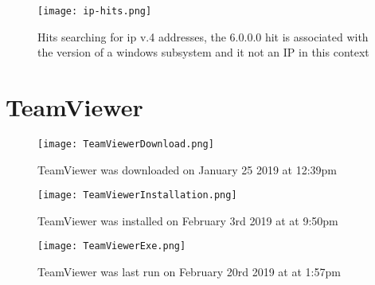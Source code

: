 \documentclass[
	letterpaper, %
	10pt, %
	unnumberedsections, %
	twoside, %
]{APAAssignment}
\begin{document}
\begin{appendices}
	\begin{figure}[!ht] %
		\centering
		\texttt{[image: ip-hits.png]}
		\caption{Hits searching for ip v.4 addresses, the 6.0.0.0 hit is associated with the version of a windows subsystem and it not an IP in this context}
		\label{fig:IpHits}
	\end{figure}
	\section{TeamViewer}\label{app:TeamViewer}

	\begin{figure}[!h] %
		\centering
		\texttt{[image: TeamViewerDownload.png]}
		\caption{TeamViewer was downloaded on January 25 2019 at 12:39pm}
		\label{fig:TeamViewerDownload}
	\end{figure}

	\begin{figure}[!h] %
		\centering
		\texttt{[image: TeamViewerInstallation.png]}
		\caption{TeamViewer was installed on February 3rd 2019 at at 9:50pm}
		\label{fig:TeamViewerInstallation}
	\end{figure}


	\begin{figure}[!h] %
		\centering
		\texttt{[image: TeamViewerExe.png]}
		\caption{TeamViewer was last run on February 20rd 2019 at at 1:57pm}
		\label{fig:TeamViewerexe}
	\end{figure}




\end{appendices}
\end{document}
